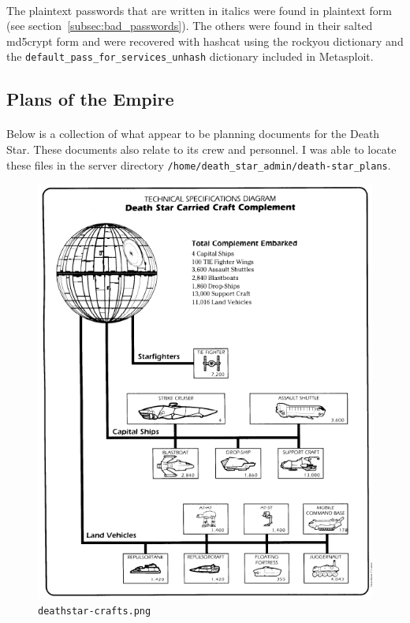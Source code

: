 \documentclass{article}
\begin{document}
\paragraph{}
The plaintext passwords that are written in italics were found in plaintext form (see section~\ref{subsec:bad_passwords}).
The others were found in their salted md5crypt form and were recovered with hashcat using the rockyou dictionary and the \texttt{default\_pass\_for\_services\_unhash} dictionary included in Metasploit.

\newpage

\subsection{Plans of the Empire}
\label{subsec:empire_plans}
\paragraph{}
Below is a collection of what appear to be planning documents for the Death Star. These documents also relate to its crew and personnel. I was able to locate these files in the server directory \texttt{/home/death\_star\_admin/death-star\_plans}.

\begin{figure}[H]
	\includegraphics[width=\linewidth]{resources/plans/deathstar-crafts.png}
	\caption{\texttt{deathstar-crafts.png}}
	\label{fig:deathstar_crafts}
\end{figure}
\end{document}
